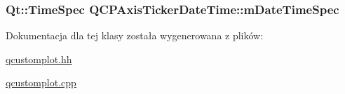 \subsubsection[{\texorpdfstring{m\+Date\+Time\+Spec}{mDateTimeSpec}}]{\setlength{\rightskip}{0pt plus 5cm}Qt\+::\+Time\+Spec Q\+C\+P\+Axis\+Ticker\+Date\+Time\+::m\+Date\+Time\+Spec\hspace{0.3cm}{\ttfamily [protected]}}\hypertarget{class_q_c_p_axis_ticker_date_time_a5f5abe83c371f13eb3415585e638dba9}{}\label{class_q_c_p_axis_ticker_date_time_a5f5abe83c371f13eb3415585e638dba9}


Dokumentacja dla tej klasy została wygenerowana z plików\+:\begin{DoxyCompactItemize}
\item 
\hyperlink{qcustomplot_8hh}{qcustomplot.\+hh}\item 
\hyperlink{qcustomplot_8cpp}{qcustomplot.\+cpp}\end{DoxyCompactItemize}
